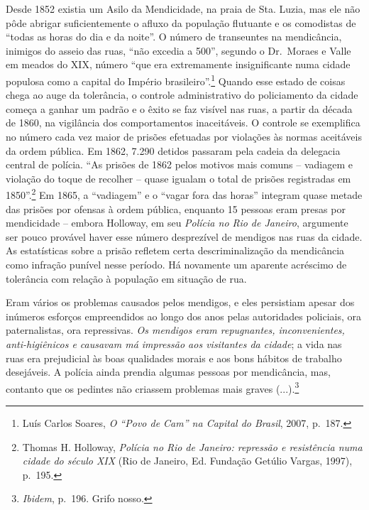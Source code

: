 Desde 1852 existia um Asilo da Mendicidade, na praia de Sta. Luzia, mas
ele não pôde abrigar suficientemente o afluxo da população flutuante e
os comodistas de ``todas as horas do dia e da noite''. O número de
transeuntes na mendicância, inimigos do asseio das ruas, ``não excedia a
500'', segundo o Dr.~Moraes e Valle em meados do XIX, número ``que era
extremamente insignificante numa cidade populosa como a capital do
Império brasileiro''.\footnote{Luís Carlos Soares, \emph{O ``Povo de
  Cam'' na Capital do Brasil}, 2007, p.~187.} Quando esse estado de
coisas chega ao auge da tolerância, o controle administrativo do
policiamento da cidade começa a ganhar um padrão e o êxito se faz
visível nas ruas, a partir da década de 1860, na vigilância dos
comportamentos inaceitáveis. O controle se exemplifica no número cada
vez maior de prisões efetuadas por violações às normas aceitáveis da
ordem pública. Em 1862, 7.290 detidos passaram pela cadeia da delegacia
central de polícia. ``As prisões de 1862 pelos motivos mais comuns --
vadiagem e violação do toque de recolher -- quase igualam o total de
prisões registradas em 1850''.\footnote{Thomas H. Holloway,
  \emph{Polícia no Rio de Janeiro: repressão e resistência numa cidade
  do século XIX} (Rio de Janeiro, Ed. Fundação Getúlio Vargas, 1997),
  p.~195.} Em 1865, a ``vadiagem'' e o ``vagar fora das horas'' integram
quase metade das prisões por ofensas à ordem pública, enquanto 15
pessoas eram presas por mendicidade -- embora Holloway, em seu
\emph{Polícia no Rio de Janeiro}, argumente ser pouco provável haver
esse número desprezível de mendigos nas ruas da cidade. As estatísticas
sobre a prisão refletem certa descriminalização da mendicância como
infração punível nesse período. Há novamente um aparente acréscimo de
tolerância com relação à população em situação de rua.

Eram vários os problemas causados pelos mendigos, e eles persistiam
apesar dos inúmeros esforços empreendidos ao longo dos anos pelas
autoridades policiais, ora paternalistas, ora repressivas. \emph{Os
mendigos eram repugnantes, inconvenientes, anti-higiênicos e causavam má
impressão aos visitantes da cidade}; a vida nas ruas era prejudicial às
boas qualidades morais e aos bons hábitos de trabalho desejáveis. A
polícia ainda prendia algumas pessoas por mendicância, mas, contanto que
os pedintes não criassem problemas mais graves (...).\footnote{\emph{Ibidem},
  p.~196. Grifo nosso.}

